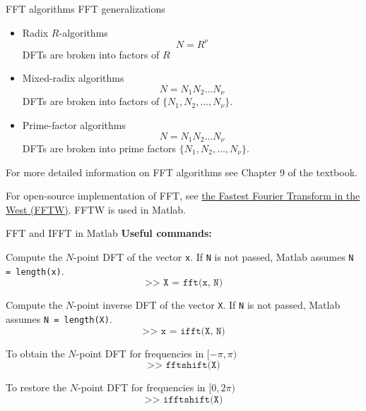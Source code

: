 \documentclass[10pt, aspectratio=169]{beamer}
\begin{document}
% 
\begin{frame}{FFT algorithms}
	FFT generalizations
	\begin{itemize}
		\item Radix $R$-algorithms
		\begin{equation*}
			N = R^\nu
		\end{equation*}
		DFTs are broken into factors of $R$
		
		\item Mixed-radix algorithms
		\begin{equation*}
			N = N_1N_2\ldots N_\nu
		\end{equation*}
		DFTs are broken into factors of $\{N_1, N_2, \ldots, N_\nu\}$.
		
		\item Prime-factor algorithms
		\begin{equation*}
			N = N_1N_2\ldots N_\nu
		\end{equation*}
		DFTs are broken into prime factors $\{N_1, N_2, \ldots, N_\nu\}$.
\end{itemize}
\vspace{0.25cm}
For more detailed information on FFT algorithms see Chapter 9 of the textbook.

\vspace{0.25cm}
For open-source implementation of FFT, see \href{http://www.fftw.org/}{the Fastest Fourier Transform in the West (FFTW)}. FFTW is used in Matlab.
\end{frame}

\begin{frame}{FFT and IFFT in Matlab}
	\textbf{Useful commands:}
	
	Compute the $N$-point DFT of the vector \texttt{x}. If \texttt{N} is not passed, Matlab assumes \texttt{N = length(x)}.
	\begin{equation*}
		\texttt{>> X = fft(x, N)}
	\end{equation*}
		
	Compute the $N$-point inverse DFT of the vector \texttt{X}. If \texttt{N} is not passed, Matlab assumes \texttt{N = length(X)}.
	\begin{equation*}
	\texttt{>> x = ifft(X, N)}
	\end{equation*}
	
	To obtain the $N$-point DFT for frequencies in $[-\pi, \pi)$
	\begin{equation*}
	\texttt{>> fftshift(X)}
	\end{equation*}
	
	To restore the $N$-point DFT for frequencies in $[0, 2\pi)$
	\begin{equation*}
	\texttt{>> ifftshift(X)}
	\end{equation*}
	
\end{frame}
\end{document}
